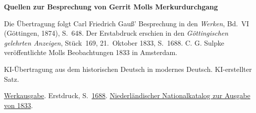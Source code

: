 \clearpage\thispagestyle{empty}
\begin{center}\Large\bfseries Quellen zur Besprechung von Gerrit Molls Merkurdurchgang\end{center}

Die Übertragung folgt Carl Friedrich Gauß’ Besprechung in den \emph{Werken}, Bd.~VI (Göttingen, 1874), S.~648. Der Erstabdruck erschien in den \emph{Göttingischen gelehrten Anzeigen}, Stück~169, 21.~Oktober 1833, S.~1688. C. G. Sulpke veröffentlichte Molls Beobachtungen 1833 in Amsterdam.

KI-Übertragung aus dem historischen Deutsch in modernes Deutsch. KI-erstellter Satz.

\href{https://gdz.sub.uni-goettingen.de/id/PPN236007467}{Werkausgabe}. Erstdruck, S.~\href{https://images.p.sub.uni-goettingen.de/iiif/image/gdz:PPN385030444_1833_2:00000650/full/1800,/0/default.jpg}{1688}. \href{https://webggc.oclc.org/cbs/DB=2.37/PPNSET?PPN=065382919}{Niederländischer Nationalkatalog zur Ausgabe von 1833}.

\clearpage
